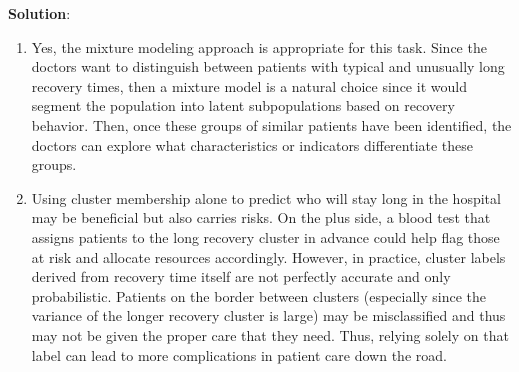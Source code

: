 \documentclass[submit]{../harvardml}
\newenvironment{solution}{
    \vspace{2mm}
    \color{blue}\noindent\textbf{Solution}:
}{}
\begin{document}
\begin{solution}
\begin{enumerate}
    \item  Yes, the mixture modeling approach is appropriate for this task. Since the doctors want to distinguish between patients with typical and unusually long recovery times, then a mixture model is a natural choice since it would segment the population into latent subpopulations based on recovery behavior. Then, once these groups of similar patients have been identified, the doctors can explore what characteristics or indicators differentiate these groups.

    \item Using cluster membership alone to predict who will stay long in the hospital may be beneficial but also carries risks. On the plus side, a blood test that assigns patients to the long recovery cluster in advance could help flag those at risk and allocate resources accordingly. However, in practice, cluster labels derived from recovery time itself are not perfectly accurate and only probabilistic. Patients on the border between clusters (especially since the variance of the longer recovery cluster is large) may be misclassified and thus may not be given the proper care that they need. Thus, relying solely on that label can lead to more complications in patient care down the road. 
\end{enumerate}
\end{solution}

\newpage
\end{document}

